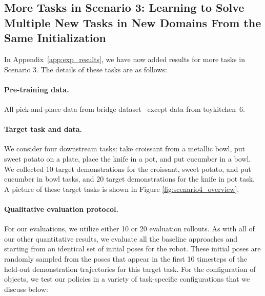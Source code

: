 \documentclass[../thesis.tex]{subfiles}
\begin{document}
\subsection{More Tasks in Scenario 3: Learning to Solve Multiple New Tasks in New Domains From the Same Initialization}
\label{app:scenario4}

In Appendix~\ref{app:exp_results}, we have now added results for more tasks in Scenario 3. The details of these tasks are as follows:

\paragraph{Pre-training data.} All pick-and-place data from bridge dataset~\citep{ebert2021bridge} except data from toykitchen~6.

\paragraph{Target task and data.} We consider four downstream tasks: take croissant from a metallic bowl, put sweet potato on a plate, place the knife in a pot, and put cucumber in a bowl. We collected 10 target demonstrations for the croissant, sweet potato, and put cucumber in bowl tasks, and 20 target demonstrations for the knife in pot task. A picture of these target tasks is shown in Figure \ref{fig:scenario4_overview}.

\paragraph{Qualitative evaluation protocol.} For our evaluations, we utilize either 10 or 20 evaluation rollouts. As with all of our other quantitative results, we evaluate all the baseline approaches and \ptrmethodname starting from an identical set of initial poses for the robot. These initial poses are randomly sampled from the poses that appear in the first 10 timesteps of the held-out demonstration trajectories for this target task. For the configuration of objects, we test our policies in a variety of task-specific configurations that we discuss below:
\end{document}
